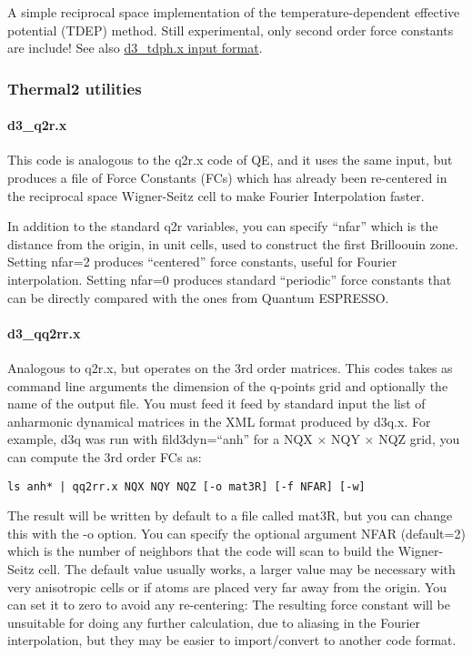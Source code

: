 \documentclass[
]{article}
\begin{document}
A simple reciprocal space implementation of the temperature-dependent
effective potential (TDEP) method. Still experimental, only second order
force constants are include! See also
\protect\hyperlink{d3_tdphx}{d3\_tdph.x input format}.

\hypertarget{thermal2-utilities}{%
\subsubsection{Thermal2 utilities}\label{thermal2-utilities}}

\hypertarget{d3_q2r.x}{%
\paragraph{d3\_q2r.x}\label{d3_q2r.x}}

This code is analogous to the q2r.x code of QE, and it uses the same
input, but produces a file of Force Constants (FCs) which has already
been re-centered in the reciprocal space Wigner-Seitz cell to make
Fourier Interpolation faster.

In addition to the standard q2r variables, you can specify
\enquote{nfar} which is the distance from the origin, in unit cells,
used to construct the first Brilloouin zone. Setting nfar=2 produces
\enquote{centered} force constants, useful for Fourier interpolation.
Setting nfar=0 produces standard \enquote{periodic} force constants that
can be directly compared with the ones from Quantum ESPRESSO.

\hypertarget{d3_qq2rr.x}{%
\paragraph{d3\_qq2rr.x}\label{d3_qq2rr.x}}

Analogous to q2r.x, but operates on the 3rd order matrices. This codes
takes as command line arguments the dimension of the q-points grid and
optionally the name of the output file. You must feed it feed by
standard input the list of anharmonic dynamical matrices in the XML
format produced by d3q.x. For example, d3q was run with
fild3dyn=\enquote{anh} for a NQX × NQY × NQZ grid, you can compute the
3rd order FCs as:

\begin{verbatim}
ls anh* | qq2rr.x NQX NQY NQZ [-o mat3R] [-f NFAR] [-w]
\end{verbatim}

The result will be written by default to a file called mat3R, but you
can change this with the -o option. You can specify the optional
argument NFAR (default=2) which is the number of neighbors that the code
will scan to build the Wigner-Seitz cell. The default value usually
works, a larger value may be necessary with very anisotropic cells or if
atoms are placed very far away from the origin. You can set it to zero
to avoid any re-centering: The resulting force constant will be
unsuitable for doing any further calculation, due to aliasing in the
Fourier interpolation, but they may be easier to import/convert to
another code format.
\end{document}

